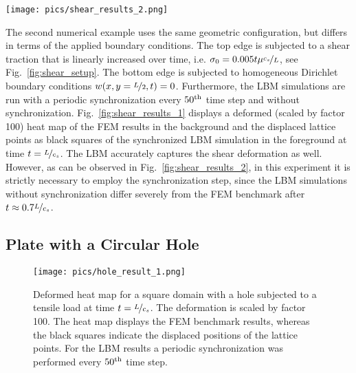 \documentclass{article}
\begin{document}
\begin{figure*}[htb]
    \centering
    \texttt{[image: pics/shear\_results\_2.png]}
    \caption{Displacement at the top left corner $P$ of a square domain subjected to a shear load.}
    \label{fig:shear_results_2}
\end{figure*}

The second numerical example uses the same geometric configuration, but differs in terms of the applied boundary conditions. The top edge is subjected to a shear traction that is linearly increased over time, i.e. $\sigma_0=0.005t\mu\nicefrac{c_s}{L}$, see Fig.~\ref{fig:shear_setup}. The bottom edge is subjected to homogeneous Dirichlet boundary conditions $w(x,y=\nicefrac{L}{2},t)=0$. Furthermore, the LBM simulations are run with a periodic synchronization every $50^{\rm th}$ time step and without synchronization. Fig.~\ref{fig:shear_results_1}  displays a deformed (scaled by factor 100) heat map of the FEM results in the background and the displaced lattice points as black squares of the synchronized LBM simulation in the foreground at time $t=\nicefrac{L}{c_s}$. The LBM accurately captures the shear deformation as well. However, as can be observed in Fig.~\ref{fig:shear_results_2}, in this experiment it is strictly necessary to employ the synchronization step, since the LBM simulations without synchronization differ severely from the FEM benchmark after $t\approx0.7\nicefrac{L}{c_s}$.



\subsection{Plate with a Circular Hole}

\begin{figure*}[htb]
    \centering
    
    \caption{A square domain with a hole subjected to a tensile load. Point $Q$ is located at ($-0.175L,0.025L$) relative to a coordinate system which has its origin in the center of the hole. The right plot displays the applied stress $\sigma_{0}(t)$ as a function of time.}
    \label{fig:hole_setup}
\end{figure*}

\begin{figure}[htb]
    \centering
    \texttt{[image: pics/hole\_result\_1.png]}
    \caption{Deformed heat map for a square domain with a hole subjected to a tensile load  at time $t=\nicefrac{L}{c_s}$. The deformation is scaled by factor 100. The heat map displays the FEM benchmark results, whereas the black squares indicate the displaced positions of the lattice points. For the LBM results a periodic synchronization was performed every $50^{\rm th}$ time step.}
    \label{fig:hole_results_1}
\end{figure}
\end{document}
